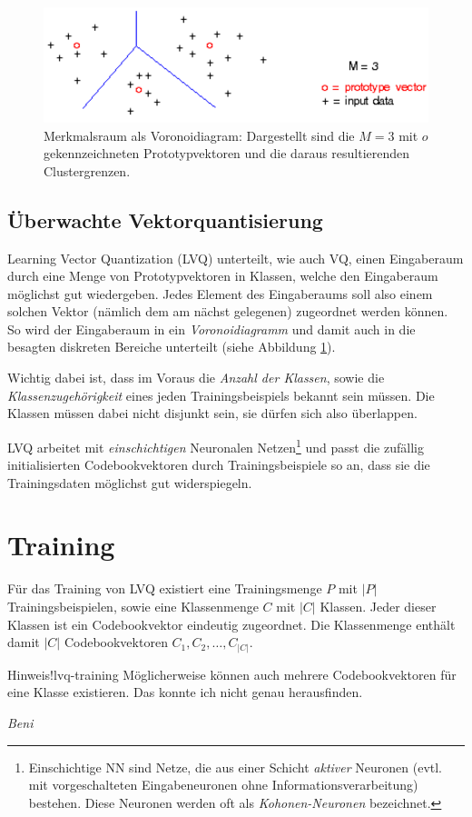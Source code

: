 \begin{figure}[ht!] \centering 
	\includegraphics[width=\linewidth]{figures/ch07_vq.pdf}
	\caption{Merkmalsraum als Voronoidiagram: Dargestellt sind die $M=3$ mit $o$ gekennzeichneten Prototypvektoren und die daraus resultierenden Clustergrenzen.}
	\label{fig:ch07_vq}
\end{figure}

\subsection*{Überwachte Vektorquantisierung}
Learning Vector Quantization (LVQ) unterteilt, wie auch VQ, einen Eingaberaum durch eine Menge von Prototypvektoren in Klassen, welche den Eingaberaum möglichst gut wiedergeben. Jedes Element des Eingaberaums soll also einem solchen Vektor (nämlich dem am nächst gelegenen) zugeordnet werden können.
So wird der Eingaberaum in ein \emph{Voronoidiagramm} und damit auch in die besagten diskreten Bereiche unterteilt (siehe Abbildung \ref{fig:ch07_vq}).

Wichtig dabei ist, dass im Voraus die \emph{Anzahl der Klassen}, sowie die \emph{Klassenzugehörigkeit} eines jeden Trainingsbeispiels bekannt sein müssen. Die Klassen müssen dabei nicht disjunkt sein, sie dürfen sich also überlappen.

LVQ arbeitet mit \emph{einschichtigen} Neuronalen Netzen\footnote{Einschichtige NN sind Netze, die aus einer Schicht \emph{aktiver} Neuronen (evtl. mit vorgeschalteten Eingabeneuronen ohne Informationsverarbeitung) bestehen. Diese Neuronen werden oft als \emph{Kohonen-Neuronen} bezeichnet.} und passt die zufällig initialisierten Codebookvektoren durch Trainingsbeispiele so an, dass sie die Trainingsdaten möglichst gut widerspiegeln.



\section*{Training}
Für das Training von LVQ existiert eine Trainingsmenge $P$ mit $|P|$ Trainingsbeispielen, sowie eine Klassenmenge $C$ mit $|C|$ Klassen. Jeder dieser Klassen ist ein Codebookvektor eindeutig zugeordnet. Die Klassenmenge enthält damit $|C|$ Codebookvektoren $C_1, C_2, \ldots, C_{|C|}$.
\begin{hint}{Hinweis!}{lvq-training}
	Möglicherweise können auch mehrere Codebookvektoren für eine Klasse existieren. Das konnte ich nicht genau herausfinden.
	\begin{flushright}\textit{Beni}\end{flushright}
\end{hint}

